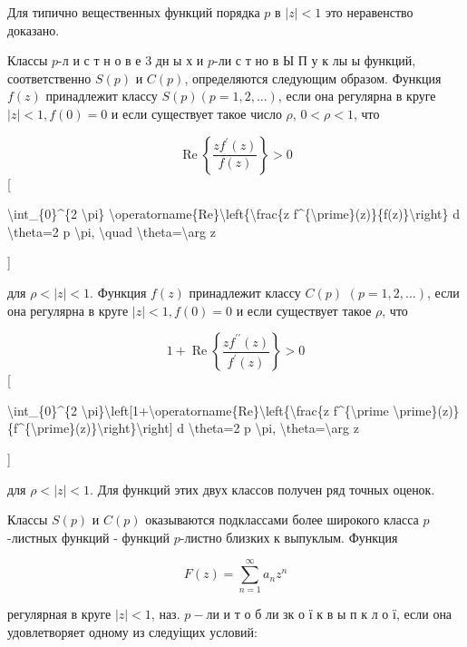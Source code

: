 \documentclass[10pt]{article}
\begin{document}
Для типично вещественных функций порядка $p$ в $|z|<1$ это неравенство доказано.



Классы $p$-л и с т н $о$ в е 3 дн ы х и $p$-ли с т но в Ы П у к лы ы функций, соответственно $S(p)$ и $C(p)$, определяются следующим образом. Функция $f(z)$ принадлежит классу $S(p)(p=1,2, \ldots)$, если она регулярна в круге $|z|<1, f(0)=0$ и если существует такое число $\rho$, $0<\rho<1$, что



\[

\operatorname{Re}\left\{\frac{z f^{\prime}(z)}{f(z)}\right\}>0

\][



\textbackslash int\_\{0\}\^{}\{2 \textbackslash pi\} \textbackslash operatorname\{Re\}\textbackslash left\{\textbackslash frac\{z f\^{}\{\textbackslash prime\}(z)\}\{f(z)\}\textbackslash right\} d \textbackslash theta=2 p \textbackslash pi, \textbackslash quad \textbackslash theta=\textbackslash arg z

]



для $\rho<|z|<1$. Функция $f(z)$ принадлежит классу $C(p)$ $(p=1,2, \ldots)$, если она регулярна в круге $|z|<1, f(0)=0$ и если существует такое $\rho$, что



\[

1+\operatorname{Re}\left\{\frac{z f^{\prime \prime}(z)}{f^{\prime}(z)}\right\}>0

\][



\textbackslash int\_\{0\}\^{}\{2 \textbackslash pi\}\textbackslash left[1+\textbackslash operatorname\{Re\}\textbackslash left\{\textbackslash frac\{z f\^{}\{\textbackslash prime \textbackslash prime\}(z)\}\{f\^{}\{\textbackslash prime\}(z)\}\textbackslash right\}\textbackslash right] d \textbackslash theta=2 p \textbackslash pi, \textbackslash theta=\textbackslash arg z

]



для $\rho<|z|<1$. Для функций этих двух классов получен ряд точных оценок.



Классы $S(p)$ и $C(p)$ оказываются подклассами более широкого класса $p$-листных функций - функций $p$-листно близких к выпуклым. Функция



\[

F(z)=\sum_{n=1}^{\infty} a_{n} z^{n}

\]



регулярная в круге $|z|<1$, наз. $p-л и$ и т о б ли зк о ї к в ы п к л о ї, если она удовлетворяет одному из следуіщих условий:
\end{document}
